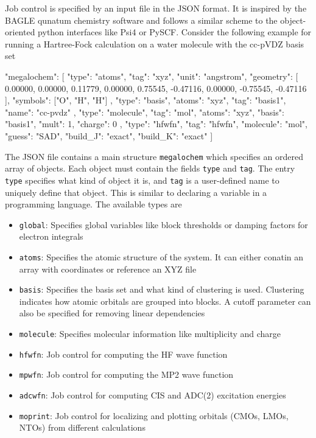 Job control is specified by an input file in the JSON format. It is inspired by the BAGLE qunatum chemistry software \cite{Shi2017} and follows a similar scheme to the object-oriented python interfaces like Psi4 or PySCF. Consider the following example for running a Hartree-Fock calculation on a water molecule with the cc-pVDZ basis set
\begin{code}
{
  "megalochem": [
  {
    "type": "atoms",
    "tag": "xyz",
    "unit": "angstrom",
    "geometry": [
      0.00000,        0.00000,        0.11779,
      0.00000,        0.75545,       -0.47116,
      0.00000,       -0.75545,       -0.47116
    ],
    "symbols": ["O", "H", "H"]
  },
  {
    "type": "basis",
    "atoms": "xyz",
    "tag": "basis1",
    "name": "cc-pvdz"
  },
  {
    "type": "molecule",
    "tag": "mol",
    "atoms": "xyz",
    "basis": "basis1",
    "mult": 1,
    "charge": 0
  },
  {
    "type": "hfwfn",
    "tag": "hfwfn",
    "molecule": "mol",
    "guess": "SAD",
    "build_J": "exact",
    "build_K": "exact"
   }]
}
\end{code}  
\noindent The JSON file contains a main structure \texttt{megalochem} which specifies an ordered array of objects. Each object must contain the fields \texttt{type} and  \texttt{tag}. The entry \texttt{type} specifies what kind of object it is, and \texttt{tag} is a user-defined name to uniquely define that object. This is similar to declaring a variable in a programming language. The available types are
\begin{itemize}
\item \texttt{global}: Specifies global variables like block thresholds or damping factors for electron integrals

\item \texttt{atoms}: Specifies the atomic structure of the system. It can either conatin an array with coordinates or reference an XYZ file

\item \texttt{basis}: Specifies the basis set and what kind of clustering is used. Clustering indicates how atomic orbitals are grouped into blocks. A cutoff parameter can also be specified for removing linear dependencies

\item \texttt{molecule}: Specifies molecular information like multiplicity and charge

\item \texttt{hfwfn}: Job control for computing the HF wave function

\item \texttt{mpwfn}: Job control for computing the MP2 wave function

\item \texttt{adcwfn}: Job control for computing CIS and ADC(2) excitation energies

\item \texttt{moprint}: Job control for localizing and plotting orbitals (CMOs, LMOs, NTOs) from different calculations

\end{itemize} 

